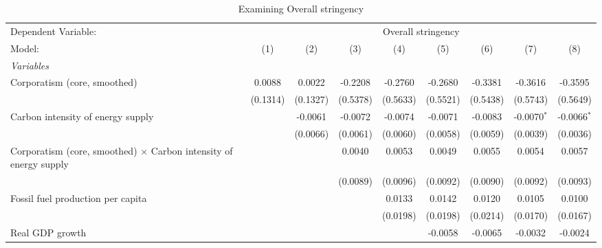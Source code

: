 
\begin{table}[htbp]
   \caption{Examining Overall stringency}
   \centering
   \begin{tabular}{lcccccccc}
      \tabularnewline \midrule \midrule
      Dependent Variable: & \multicolumn{8}{c}{Overall stringency}\\
      Model:                                                                   & (1)                   & (2)      & (3)      & (4)      & (5)      & (6)      & (7)           & (8)\\  
      \midrule
      \emph{Variables}\\
      Corporatism (core, smoothed)                                             & 0.0088                & 0.0022   & -0.2208  & -0.2760  & -0.2680  & -0.3381  & -0.3616       & -0.3595\\   
                                                                               & (0.1314)              & (0.1327) & (0.5378) & (0.5633) & (0.5521) & (0.5438) & (0.5743)      & (0.5649)\\   
      Carbon intensity of energy supply                                        &                       & -0.0061  & -0.0072  & -0.0074  & -0.0071  & -0.0083  & -0.0070$^{*}$ & -0.0066$^{*}$\\   
                                                                               &                       & (0.0066) & (0.0061) & (0.0060) & (0.0058) & (0.0059) & (0.0039)      & (0.0036)\\   
      Corporatism (core, smoothed) $\times$ Carbon intensity of energy supply  &                       &          & 0.0040   & 0.0053   & 0.0049   & 0.0055   & 0.0054        & 0.0057\\   
                                                                               &                       &          & (0.0089) & (0.0096) & (0.0092) & (0.0090) & (0.0092)      & (0.0093)\\   
      Fossil fuel production per capita                                        &                       &          &          & 0.0133   & 0.0142   & 0.0120   & 0.0105        & 0.0100\\   
                                                                               &                       &          &          & (0.0198) & (0.0198) & (0.0214) & (0.0170)      & (0.0167)\\   
      Real GDP growth                                                          &                       &          &          &          & -0.0058  & -0.0065  & -0.0032       & -0.0024\\   

\end{tabular}
\end{table}
